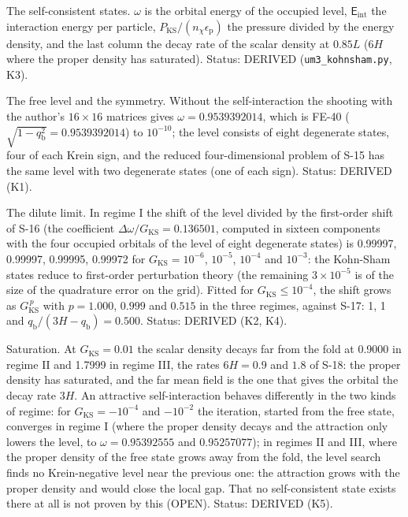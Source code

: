 \documentclass[
  10pt,
]{article}
\begin{document}
The self-consistent states. \(\omega\) is the orbital energy of the
occupied level, \(\mathsf{E}_{\mathrm{int}}\) the interaction energy per
particle, \(P_{\mathrm{KS}}/(n_\chi\epsilon_{\mathrm{p}})\) the pressure
divided by the energy density, and the last column the decay rate of the
scalar density at \(0.85L\) (\(6H\) where the proper density has
saturated). Status: DERIVED (\texttt{um3\_kohnsham.py}, K3).

The free level and the symmetry. Without the self-interaction the
shooting with the author's \(16 \times 16\) matrices gives
\(\omega = 0.9539392014\), which is FE-40
(\(\sqrt{1 - q_{\mathrm{b}}^2} = 0.9539392014\)) to \(10^{-10}\); the
level consists of eight degenerate states, four of each Krein sign, and
the reduced four-dimensional problem of S-15 has the same level with two
degenerate states (one of each sign). Status: DERIVED (K1).

The dilute limit. In regime I the shift of the level divided by the
first-order shift of S-16 (the coefficient
\(\Delta\omega/G_{\mathrm{KS}} = 0.136501\), computed in sixteen
components with the four occupied orbitals of the level of eight
degenerate states) is 0.99997, 0.99997, 0.99995, 0.99972 for
\(G_{\mathrm{KS}} = 10^{-6}\), \(10^{-5}\), \(10^{-4}\) and \(10^{-3}\):
the Kohn-Sham states reduce to first-order perturbation theory (the
remaining \(3\times10^{-5}\) is of the size of the quadrature error on
the grid). Fitted for \(G_{\mathrm{KS}} \le 10^{-4}\), the shift grows
as \(G_{\mathrm{KS}}^{\,p}\) with \(p = 1.000\), \(0.999\) and \(0.515\)
in the three regimes, against S-17: 1, 1 and
\(q_{\mathrm{b}}/(3H - q_{\mathrm{b}}) = 0.500\). Status: DERIVED (K2,
K4).

Saturation. At \(G_{\mathrm{KS}} = 0.01\) the scalar density decays far
from the fold at 0.9000 in regime II and 1.7999 in regime III, the rates
\(6H = 0.9\) and \(1.8\) of S-18: the proper density has saturated, and
the far mean field is the one that gives the orbital the decay rate
\(3H\). An attractive self-interaction behaves differently in the two
kinds of regime: for \(G_{\mathrm{KS}} = -10^{-4}\) and \(-10^{-2}\) the
iteration, started from the free state, converges in regime I (where the
proper density decays and the attraction only lowers the level, to
\(\omega = 0.95392555\) and \(0.95257077\)); in regimes II and III,
where the proper density of the free state grows away from the fold, the
level search finds no Krein-negative level near the previous one: the
attraction grows with the proper density and would close the local gap.
That no self-consistent state exists there at all is not proven by this
(OPEN). Status: DERIVED (K5).
\end{document}
